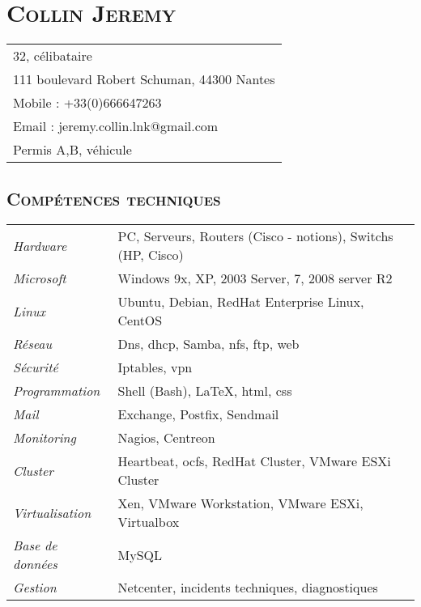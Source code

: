 \documentclass[a4paper,8pt]{article}
\newcommand{\hsection}[1]{\section*{\fontfamily{phv}\selectfont\textsc{#1}}}
\newcommand{\hsubsection}[1]{\subsection*{\fontfamily{phv}\selectfont\textsc{#1}}}
\begin{document}
\selectfont
\hsection{Collin Jeremy}
\begin{tabular}{p{16.5cm}}
\hline
32, célibataire\\
111 boulevard Robert Schuman, 44300 Nantes\\
Mobile : +33(0)666647263\\
Email : jeremy.collin.lnk@gmail.com\\
Permis A,B, véhicule\\
\end{tabular}

\hsubsection{Compétences techniques}
\begin{tabular}{P{3.5cm}|p{13cm}}
\textsl{Hardware}		& PC, Serveurs, Routers (Cisco - notions), Switchs (HP, Cisco)\\
\textsl{Microsoft}		& Windows 9x, XP, 2003 Server, 7, 2008 server R2\\
\textsl{Linux}			& Ubuntu, Debian, RedHat Enterprise Linux, CentOS\\
\textsl{Réseau}			& Dns, dhcp, Samba, nfs, ftp, web\\
\textsl{Sécurité}		& Iptables, vpn\\
\textsl{Programmation}		& Shell (Bash), \LaTeX, html, css\\
\textsl{Mail}			& Exchange, Postfix, Sendmail\\
\textsl{Monitoring}		& Nagios, Centreon\\
\textsl{Cluster}		& Heartbeat, ocfs, RedHat Cluster, VMware ESXi Cluster\\
\textsl{Virtualisation}		& Xen, VMware Workstation, VMware ESXi, Virtualbox\\
\textsl{Base de données}	& MySQL\\
\textsl{Gestion}		& Netcenter, incidents techniques, diagnostiques\\
\end{tabular}
\end{document}

